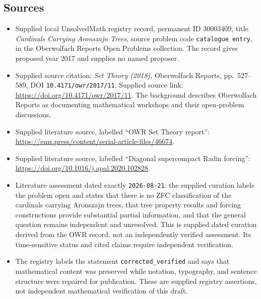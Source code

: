 \documentclass[11pt]{article}
\begin{document}
\subsection{Sources}
\begin{itemize}
\item Supplied local UnsolvedMath registry record, permanent ID \(30003409\), title \emph{Cardinals Carrying Aronszajn Trees}, source problem code \texttt{catalogue entry}, in the Oberwolfach Reports Open Problems collection. The record gives proposed year 2017 and supplies no named proposer.
\item Supplied source citation: \emph{Set Theory (2018)}, Oberwolfach Reports, pp.~527--589, DOI \texttt{10.4171/owr/2017/11}. Supplied source link: \url{https://doi.org/10.4171/owr/2017/11}. The background describes Oberwolfach Reports as documenting mathematical workshops and their open-problem discussions.
\item Supplied literature source, labelled ``OWR Set Theory report'': \url{https://ems.press/content/serial-article-files/46674}.
\item Supplied literature source, labelled ``Diagonal supercompact Radin forcing'': \url{https://doi.org/10.1016/j.apal.2020.102828}.
\item Literature assessment dated exactly \texttt{2026-08-21}: the supplied curation labels the problem open and states that there is no ZFC classification of the cardinals carrying Aronszajn trees, that tree property results and forcing constructions provide substantial partial information, and that the general question remains independent and unresolved. This is supplied dated curation derived from the OWR record, not an independently verified assessment. Its time-sensitive status and cited claims require independent verification.
\item The registry labels the statement \texttt{corrected\_verified} and says that mathematical content was preserved while notation, typography, and sentence structure were repaired for publication. These are supplied registry assertions, not independent mathematical verification of this draft.
\end{itemize}
\end{document}
